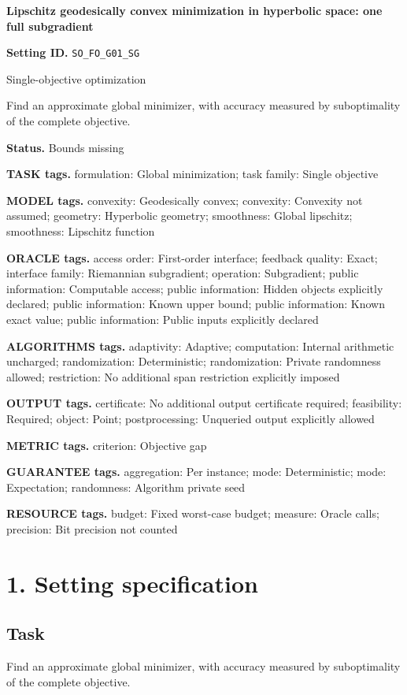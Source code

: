\documentclass[10pt,a4paper]{article}
\begin{document}
\raggedright

{\LARGE\bfseries\sffamily\color{AtlasNavy} Lipschitz geodesically convex minimization in hyperbolic space: one full subgradient\par}\vspace{5pt}
\textbf{Setting ID.} \texttt{SO\_\allowbreak{}FO\_\allowbreak{}G01\_\allowbreak{}SG}

Single-objective optimization

Find an approximate global minimizer, with accuracy measured by suboptimality of the complete objective.

\textbf{Status.} Bounds missing

\textbf{TASK tags.} formulation: Global minimization; task family: Single objective

\textbf{MODEL tags.} convexity: Geodesically convex; convexity: Convexity not assumed; geometry: Hyperbolic geometry; smoothness: Global lipschitz; smoothness: Lipschitz function

\textbf{ORACLE tags.} access order: First-order interface; feedback quality: Exact; interface family: Riemannian subgradient; operation: Subgradient; public information: Computable access; public information: Hidden objects explicitly declared; public information: Known upper bound; public information: Known exact value; public information: Public inputs explicitly declared

\textbf{ALGORITHMS tags.} adaptivity: Adaptive; computation: Internal arithmetic uncharged; randomization: Deterministic; randomization: Private randomness allowed; restriction: No additional span restriction explicitly imposed

\textbf{OUTPUT tags.} certificate: No additional output certificate required; feasibility: Required; object: Point; postprocessing: Unqueried output explicitly allowed

\textbf{METRIC tags.} criterion: Objective gap

\textbf{GUARANTEE tags.} aggregation: Per instance; mode: Deterministic; mode: Expectation; randomness: Algorithm private seed

\textbf{RESOURCE tags.} budget: Fixed worst-case budget; measure: Oracle calls; precision: Bit precision not counted

\section{1. Setting specification}
\subsection{Task}
Find an approximate global minimizer, with accuracy measured by suboptimality of the complete objective.
\end{document}
